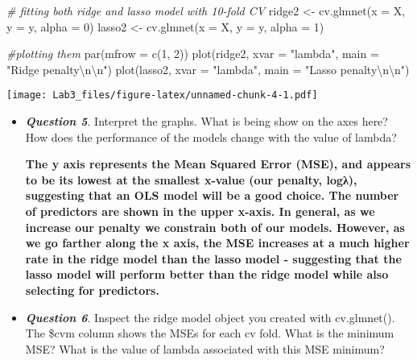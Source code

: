 \documentclass[
]{article}
\newenvironment{Shaded}{\begin{snugshade}}{\end{snugshade}}
\newcommand{\AttributeTok}[1]{\textcolor[rgb]{0.77,0.63,0.00}{#1}}
\newcommand{\CommentTok}[1]{\textcolor[rgb]{0.56,0.35,0.01}{\textit{#1}}}
\newcommand{\DecValTok}[1]{\textcolor[rgb]{0.00,0.00,0.81}{#1}}
\newcommand{\FunctionTok}[1]{\textcolor[rgb]{0.00,0.00,0.00}{#1}}
\newcommand{\NormalTok}[1]{#1}
\newcommand{\OtherTok}[1]{\textcolor[rgb]{0.56,0.35,0.01}{#1}}
\newcommand{\SpecialCharTok}[1]{\textcolor[rgb]{0.00,0.00,0.00}{#1}}
\newcommand{\StringTok}[1]{\textcolor[rgb]{0.31,0.60,0.02}{#1}}
\begin{document}
\begin{Shaded}
\begin{Highlighting}[]
\CommentTok{\# fitting both ridge and lasso model with 10{-}fold CV}
\NormalTok{ridge2 }\OtherTok{\textless{}{-}} \FunctionTok{cv.glmnet}\NormalTok{(}\AttributeTok{x =}\NormalTok{ X, }\AttributeTok{y =}\NormalTok{ y, }\AttributeTok{alpha =} \DecValTok{0}\NormalTok{) }
\NormalTok{lasso2 }\OtherTok{\textless{}{-}} \FunctionTok{cv.glmnet}\NormalTok{(}\AttributeTok{x =}\NormalTok{ X, }\AttributeTok{y =}\NormalTok{ y, }\AttributeTok{alpha =} \DecValTok{1}\NormalTok{) }

\CommentTok{\#plotting them}
\FunctionTok{par}\NormalTok{(}\AttributeTok{mfrow =} \FunctionTok{c}\NormalTok{(}\DecValTok{1}\NormalTok{, }\DecValTok{2}\NormalTok{))}
\FunctionTok{plot}\NormalTok{(ridge2, }\AttributeTok{xvar =} \StringTok{"lambda"}\NormalTok{, }\AttributeTok{main =} \StringTok{"Ridge penalty}\SpecialCharTok{\textbackslash{}n\textbackslash{}n}\StringTok{"}\NormalTok{)}
\FunctionTok{plot}\NormalTok{(lasso2, }\AttributeTok{xvar =} \StringTok{"lambda"}\NormalTok{, }\AttributeTok{main =} \StringTok{"Lasso penalty}\SpecialCharTok{\textbackslash{}n\textbackslash{}n}\StringTok{"}\NormalTok{)}
\end{Highlighting}
\end{Shaded}

\texttt{[image: Lab3\_files/figure-latex/unnamed-chunk-4-1.pdf]}

\begin{itemize}
\item
  \textbf{\emph{Question 5}}. Interpret the graphs. What is being show
  on the axes here? How does the performance of the models change with
  the value of lambda?

  \textbf{The y axis represents the Mean Squared Error (MSE), and
  appears to be its lowest at the smallest x-value (our penalty, logλ),
  suggesting that an OLS model will be a good choice. The number of
  predictors are shown in the upper x-axis. In general, as we increase
  our penalty we constrain both of our models. However, as we go farther
  along the x axis, the MSE increases at a much higher rate in the ridge
  model than the lasso model - suggesting that the lasso model will
  perform better than the ridge model while also selecting for
  predictors.}
\item
  \textbf{\emph{Question 6}}. Inspect the ridge model object you created
  with cv.glmnet(). The \$cvm column shows the MSEs for each cv fold.
  What is the minimum MSE? What is the value of lambda associated with
  this MSE minimum?
\end{itemize}
\end{document}
